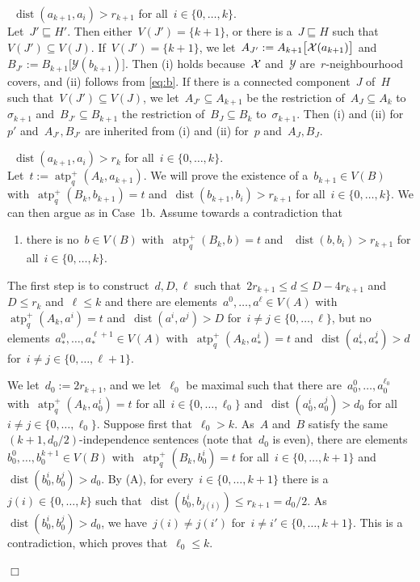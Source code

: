 \documentclass[11pt]{article}
\numberwithin{equation}{section}
\newcommand{\YYY}{\mathcal{Y}} \newcommand{\ZZZ}{\mathcal{Z}}
\newcommand{\atp}{\operatorname{atp}^+}
\newcommand{\dist}{\operatorname{dist}}
\newcommand{\case}[1]{\par\medskip\noindent\textit{Case #1: }}
\newenvironment{cs}{
  \begin{description}
    \renewcommand{\case}[1]{\item[\itshape\mdseries Case ##1:]}
  }{
  \end{description}
}
\def\qed{\hspace*{\fill}$\Box$}
\newenvironment{proof}[1][]%
{\ifthenelse{\equal{#1}{}}{\noindent\textit{Proof.
    }}{\noindent\textit{#1. }}}%
{\qed\par\smallskip}
\begin{document}
\begin{proof}
\begin{cs}
\begin{cs}
      \case{1b}~$\dist(a_{k+1},a_i)> r_{k+1}$ for all~$i\in \{0,\ldots, k\}$.\\
      Let~$J'\sqsubseteq H'$. Then either~$V(J')=\{k+1\}$, or there is
      a~$J\sqsubseteq H$ such that~$V(J')\subseteq
      V(J)$. If~$V(J')=\{k+1\}$, we
      let~$A_{J'}:=A_{k+1}\big[\mathcal{X}(a_{k+1})\big]$
      and~$B_{J'}:=B_{k+1}\big[\YYY(b_{k+1})\big]$. Then (i) holds
      because~$\mathcal{X}$ and~$\YYY$ are~$r$-neighbourhood covers, and (ii)
      follows from \eqref{eq:b}. If there is a connected component~$J$
      of~$H$ such that~$V(J')\subseteq V(J)$, we let~$A_{J'}\subseteq
      A_{k+1}$ be the restriction of~$A_J\subseteq A_k$
      to~$\sigma_{k+1}$ and~$B_{J'}\subseteq B_{k+1}$ the restriction
      of~$B_J\subseteq B_k$ to~$\sigma_{k+1}$. Then (i) and (ii)
      for~$p'$ and~$A_{J'},B_{J'}$ are inherited from (i) and (ii)
      for~$p$ and~$A_J,B_J$.
    \end{cs}


    \case2~$\dist(a_{k+1},a_i)>r_k$ for all~$i\in \{0,\ldots, k\}$.\\
    Let~$t:=\atp_q(A_k,a_{k+1})$. We will prove the existence of
    a~$b_{k+1}\in V(B)$ with~$\atp_q(B_k,b_{k+1})=t$
    and~$\dist(b_{k+1},b_i)> r_{k+1}$ for all~$i\in \{0,\ldots,
    k\}$. We can then argue as in Case~1b. Assume towards a
    contradiction that
    \begin{enumerate}
    \item[(A)] there is no~$b\in V(B)$ with~$\atp_q(B_k,b)=t$ and
      ~$\dist(b,b_i)> r_{k+1}$ for all~$i\in \{0,\ldots, k\}$.
    \end{enumerate}

    The first step is to construct~$d,D,\ell$ such that~$2r_{k+1}\le
    d\le D-4r_{k+1}$ and~$D\le r_k$ and~$\ell\le k$ and there are
    elements~$a^0,\ldots,a^\ell\in V(A)$ with~$\atp_q(A_k,a^i)=t$
    and~$\dist(a^i,a^j)>D$ for~$i\neq j\in\{0,\ldots,\ell\}$, but no
    elements~$a_*^0,\ldots,a_*^{\ell+1}\in V(A)$
    with~$\atp_q(A_k,a_*^i)=t$ and~$\dist(a_*^i,a_*^j)>d$ for~$i\neq
    j\in\{0,\ldots, \ell+1\}$.

    We let~$d_0:=2r_{k+1}$, and we let~$\ell_0$ be maximal such that
    there are~$a^0_0,\ldots,a^{\ell_0}_0$ with~$\atp_q(A_k,a_0^i)=t$
    for all~$i\in\{0,\ldots, \ell_0\}$ and~$\dist(a_0^i,a_0^j)>d_0$
    for all~$i\neq j\in\{0,\ldots, \ell_0\}$. Suppose first
    that~$\ell_0>k$. As~$A$ and~$B$ satisfy the
    same~$(k+1,d_0/2)$-independence sentences (note that~$d_0$ is
    even), there are elements~$b_0^0,\ldots,b_0^{k+1}\in V(B)$
    with~$\atp_q(B_k,b_0^i)=t$ for all~$i\in\{0,\ldots, k+1\}$
    and~$\dist(b_0^i,b_0^j)>d_0$. By (A), for every~$i\in\{0,\ldots,
    k+1\}$ there is a~$j(i)\in\{0,\ldots, k\}$ such
    that~$\dist(b^i_0,b_{j(i)})\le
    r_{k+1}=d_0/2$. As~$\dist(b_0^i,b_0^j)>d_0$, we have~$j(i)\neq
    j(i')$ for~$i\neq i'\in\{0,\ldots, k+1\}$. This is a
    contradiction, which proves that~$\ell_0\le k$.


\end{cs}
\end{proof}
\end{document}
